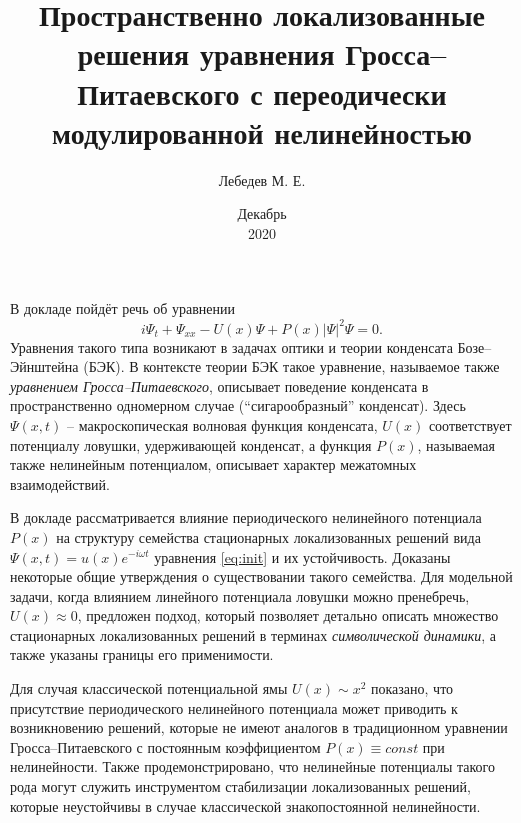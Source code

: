 \documentclass [a4paper] {article}
\title{Пространственно локализованные решения уравнения Гросса--Питаевского с переодически модулированной нелинейностью}
\author{Лебедев М. Е.}
\affil{Институт математики с вычислительным центром \\ УФИЦ РАН}
\date{Декабрь \\ 2020}
\begin{document}
\maketitle
\thispagestyle{empty} %

В докладе пойдёт речь об уравнении
\begin{equation}
i \Psi_t + \Psi_{xx} - U(x) \Psi + P(x) |\Psi|^2 \Psi = 0.
\label{eq:init}
\end{equation}
Уравнения такого типа возникают в задачах оптики и теории конденсата Бозе--Эйнштейна (БЭК).
В контексте теории БЭК такое уравнение, называемое также {\it уравнением Гросса--Питаевского}, описывает поведение конденсата в пространственно одномерном случае (``сигарообразный'' конденсат).
Здесь $\Psi(x, t)$ -- макроскопическая волновая функция конденсата, $U(x)$ соответствует потенциалу ловушки, удерживающей конденсат, а функция $P(x)$, называемая также нелинейным потенциалом, описывает характер межатомных взаимодействий.

В докладе рассматривается влияние периодического нелинейного потенциала $P(x)$ на структуру семейства стационарных локализованных решений вида $\Psi(x, t) = u(x) e^{-i \omega t}$ уравнения \eqref{eq:init} и их устойчивость.
Доказаны некоторые общие утверждения о существовании такого семейства.
Для модельной задачи, когда влиянием линейного потенциала ловушки можно пренебречь, $U(x) \approx 0$, предложен подход, который позволяет детально описать множество стационарных локализованных решений в терминах {\it символической динамики}, а также указаны границы его применимости.

Для случая классической потенциальной ямы $U(x) \sim x^2$ показано, что присутствие периодического нелинейного потенциала может приводить к возникновению решений, которые не имеют аналогов в традиционном уравнении Гросса--Питаевского с постоянным коэффициентом $P(x) \equiv const$ при нелинейности.
Также продемонстрировано, что нелинейные потенциалы такого рода могут служить инструментом стабилизации локализованных решений, которые неустойчивы в случае классической знакопостоянной нелинейности.
\end{document}
